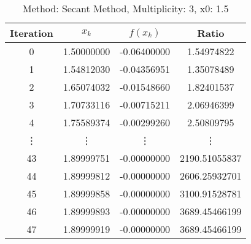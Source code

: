 \begin{table}
\centering
\caption{Method: Secant Method, Multiplicity: 3, x0: 1.5}
\label{tab:table_Secant_Method_3_1_5}
\begin{tabular}{c c c c}
\toprule
Iteration &      $x_k$ &    $f(x_k)$ &         Ratio \\
\midrule
        0 & 1.50000000 & -0.06400000 &    1.54974822 \\
        1 & 1.54812030 & -0.04356951 &    1.35078489 \\
        2 & 1.65074032 & -0.01548660 &    1.82401537 \\
        3 & 1.70733116 & -0.00715211 &    2.06946399 \\
        4 & 1.75589374 & -0.00299260 &    2.50809795 \\
   \vdots &     \vdots &      \vdots &        \vdots \\
       43 & 1.89999751 & -0.00000000 & 2190.51055837 \\
       44 & 1.89999812 & -0.00000000 & 2606.25932701 \\
       45 & 1.89999858 & -0.00000000 & 3100.91528781 \\
       46 & 1.89999893 & -0.00000000 & 3689.45466199 \\
       47 & 1.89999919 & -0.00000000 & 3689.45466199 \\
\bottomrule
\end{tabular}
\end{table}

